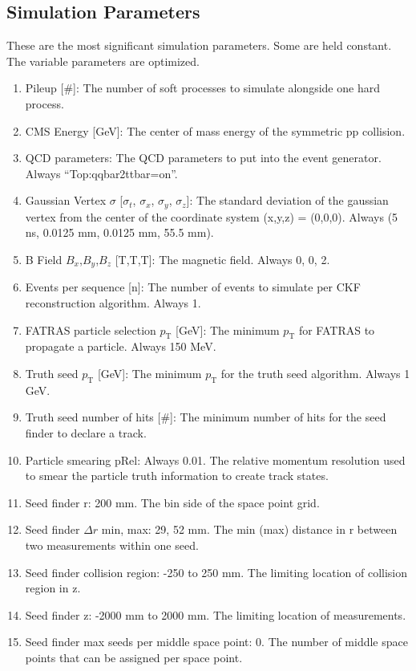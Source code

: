 \documentclass{article}
\newcommand{\pt}[0]{p_\textrm{T}}
\begin{document}
\subsection{\label{spnfuad}Simulation Parameters}

These are the most significant simulation parameters. Some are held constant. The variable parameters are optimized.

\begin{enumerate}
\item Pileup [\#]: The number of soft processes to simulate alongside one hard process.
\item CMS Energy [GeV]: The center of mass energy of the symmetric pp collision.
\item QCD parameters: The QCD parameters to put into the event generator. Always ``Top:qqbar2ttbar=on''.
\item Gaussian Vertex $\sigma$ [$\sigma_t$, $\sigma_x$, $\sigma_y$, $\sigma_z$]: The standard deviation of the gaussian vertex from the center of the coordinate system (x,y,z) = (0,0,0). Always (5 ns, 0.0125 mm, 0.0125 mm, 55.5 mm).
\item B Field $B_x$,$B_y$,$B_z$ [T,T,T]: The magnetic field. Always 0, 0, 2.
\item Events per sequence [n]: The number of events to simulate per CKF reconstruction algorithm. Always 1.
\item FATRAS particle selection $\pt$ [GeV]: The minimum $\pt$ for FATRAS to propagate a particle. Always 150 MeV.
\item Truth seed $\pt$ [GeV]: The minimum $\pt$ for the truth seed algorithm. Always 1 GeV.
\item Truth seed number of hits [\#]: The minimum number of hits for the seed finder to declare a track.
\item Particle smearing pRel: Always 0.01. The relative momentum resolution used to smear the particle truth information to create track states.
\item Seed finder r: 200 mm. The bin side of the space point grid.
\item Seed finder $\Delta r$ min, max: 29, 52 mm. The min (max) distance in r between two measurements within one seed.
\item Seed finder collision region: -250 to 250 mm. The limiting location of collision region in z.
\item Seed finder z: -2000 mm to 2000 mm. The limiting location of measurements.
\item Seed finder max seeds per middle space point: 0. The number of middle space points that can be assigned per space point.

\end{enumerate}
\end{document}

